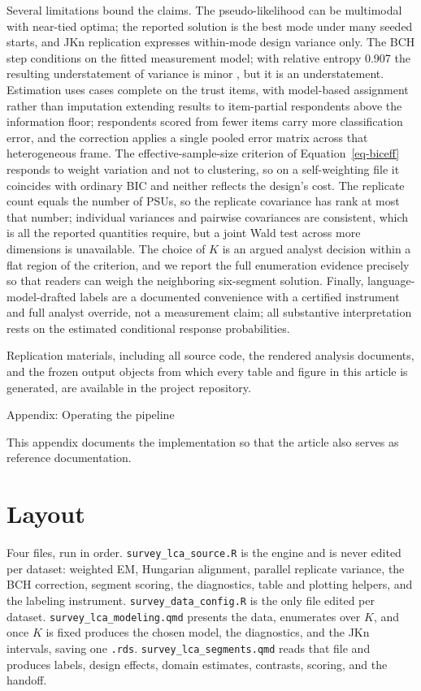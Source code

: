 \documentclass[
  12pt]{article}
\begin{document}
Several limitations bound the claims. The pseudo-likelihood can be
multimodal with near-tied optima; the reported solution is the best mode
under many seeded starts, and JKn replication expresses within-mode
design variance only. The BCH step conditions on the fitted measurement
model; with relative entropy 0.907 the resulting understatement of
variance is minor \citep{bakk2014}, but it is an understatement.
Estimation uses cases complete on the trust items, with model-based
assignment rather than imputation extending results to item-partial
respondents above the information floor; respondents scored from fewer
items carry more classification error, and the correction applies a
single pooled error matrix across that heterogeneous frame. The
effective-sample-size criterion of Equation~\ref{eq-biceff} responds to
weight variation and not to clustering, so on a self-weighting file it
coincides with ordinary BIC and neither reflects the design's cost. The
replicate count equals the number of PSUs, so the replicate covariance
has rank at most that number; individual variances and pairwise
covariances are consistent, which is all the reported quantities
require, but a joint Wald test across more dimensions is unavailable.
The choice of \(K\) is an argued analyst decision within a flat region
of the criterion, and we report the full enumeration evidence precisely
so that readers can weigh the neighboring six-segment solution. Finally,
language-model-drafted labels are a documented convenience with a
certified instrument and full analyst override, not a measurement claim;
all substantive interpretation rests on the estimated conditional
response probabilities.

Replication materials, including all source code, the rendered analysis
documents, and the frozen output objects from which every table and
figure in this article is generated, are available in the project
repository.

Appendix: Operating the pipeline

This appendix documents the implementation so that the article also
serves as reference documentation.

\section{Layout}\label{layout}

Four files, run in order. \texttt{survey\_lca\_source.R} is the engine
and is never edited per dataset: weighted EM, Hungarian alignment,
parallel replicate variance, the BCH correction, segment scoring, the
diagnostics, table and plotting helpers, and the labeling instrument.
\texttt{survey\_data\_config.R} is the only file edited per dataset.
\texttt{survey\_lca\_modeling.qmd} presents the data, enumerates over
\(K\), and once \(K\) is fixed produces the chosen model, the
diagnostics, and the JKn intervals, saving one \texttt{.rds}.
\texttt{survey\_lca\_segments.qmd} reads that file and produces labels,
design effects, domain estimates, contrasts, scoring, and the handoff.
\end{document}
